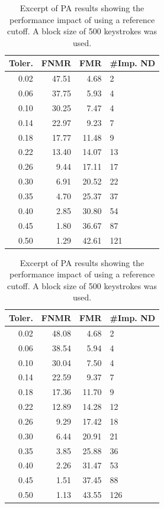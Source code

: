 \begin{table}[h]
\centering
\begin{subtable}[h]{0.45\textwidth}
\begin{tabular}{rrrl}
\hline
Toler. & FNMR & FMR & \#Imp. ND  \\ \hline
0.02 & 47.51 & 4.68  & 2   \\
0.06 & 37.75 & 5.93  & 4   \\
0.10  & 30.25 & 7.47  & 4   \\
0.14 & 22.97 & 9.23  & 7   \\
0.18 & 17.77 & 11.48 & 9   \\
0.22 & 13.40 & 14.07 & 13  \\
0.26 & 9.44  & 17.11 & 17  \\
0.30 & 6.91  & 20.52 & 22  \\
0.35 & 4.70  & 25.37 & 37  \\
0.40 & 2.85  & 30.80 & 54  \\
0.45 & 1.80  & 36.67 & 87  \\
0.50 & 1.29  & 42.61 & 121
 \end{tabular}
 \caption{Without reference cutoff.}
 \label{tab:PA-without-cutoff}
\end{subtable}
\hfill
\begin{subtable}[h]{0.45\textwidth}
\centering
\begin{tabular}{rrrl}
\hline
Toler. & FNMR  & FMR & \#Imp. ND \\ \hline
0.02 & 48.08 & 4.68  & 2   \\
0.06 & 38.54 & 5.94  & 4   \\
0.10 & 30.04 & 7.50  & 4   \\
0.14 & 22.59 & 9.37  & 7   \\
0.18 & 17.36 & 11.70 & 9   \\
0.22 & 12.89 & 14.28 & 12  \\
0.26 & 9.29  & 17.42 & 18  \\
0.30 & 6.44  & 20.91 & 21  \\
0.35 & 3.85  & 25.88 & 36  \\
0.40 & 2.26  & 31.47 & 53  \\
0.45 & 1.51  & 37.45 & 88  \\
0.50 & 1.13  & 43.55 & 126
\end{tabular}
\caption{With reference cutoff.}
\label{tab:PA-with-cutoff}
\end{subtable}
\caption{Excerpt of PA results showing the performance impact of using a reference cutoff. A block size of 500 keystrokes was used.}
\label{tab:PA-cutoff}
\end{table}

